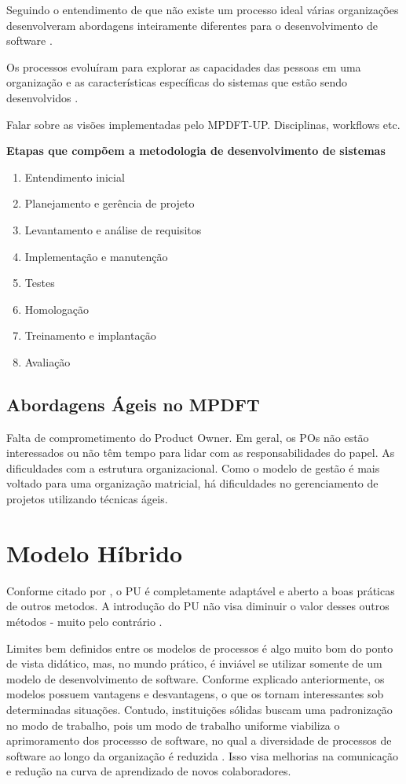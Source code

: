 \documentclass[
	article,			%
	11pt,				%
	oneside,			%
	a4paper,			%
	english,			%
	brazil,				%
	sumario=tradicional
	]{abntex2}
\begin{document}
Seguindo o entendimento de que não existe um processo ideal várias organizações
desenvolveram abordagens inteiramente diferentes para o desenvolvimento de
software \cite{sommerville2007}.

Os processos evoluíram para explorar as capacidades das pessoas em uma
organização e as características específicas do sistemas que estão sendo
desenvolvidos \cite{sommerville2007}.

Falar sobre as visões implementadas pelo MPDFT-UP. Disciplinas, workflows etc.

\textbf{Etapas que compõem a metodologia de desenvolvimento de sistemas}

\begin{enumerate}
   \item Entendimento inicial
   \item Planejamento e gerência de projeto
   \item Levantamento e análise de requisitos
   \item Implementação e manutenção
   \item Testes
   \item Homologação
   \item Treinamento e implantação
   \item Avaliação
\end{enumerate}

\subsection{Abordagens Ágeis no MPDFT}

   Falta de comprometimento do Product Owner. Em geral, os POs não estão
   interessados ou não têm tempo para lidar com as responsabilidades do papel.
   As dificuldades com a estrutura organizacional. Como o modelo de gestão é
   mais voltado para uma organização matricial, há dificuldades no
   gerenciamento de projetos utilizando técnicas ágeis.

\section{Modelo Híbrido}

Conforme citado por , o PU é completamente
adaptável e aberto a boas práticas de outros metodos. A introdução do PU não
visa diminuir o valor desses outros métodos - muito pelo contrário
\cite{larman2007utilizando}.

Limites bem definidos entre os modelos de processos é algo muito bom do ponto de
vista didático, mas, no mundo prático, é inviável se utilizar somente de um
modelo de desenvolvimento de software. Conforme explicado anteriormente, os
modelos possuem vantagens e desvantagens, o que os tornam interessantes sob
determinadas situações. Contudo, instituições sólidas buscam uma padronização no
modo de trabalho, pois um modo de trabalho uniforme viabiliza o aprimoramento
dos processso de software, no qual a diversidade de processos de software ao
longo da organização é reduzida \cite{sommerville2007}. Isso visa melhorias na
comunicação e redução na curva de aprendizado de novos colaboradores.
\end{document}
